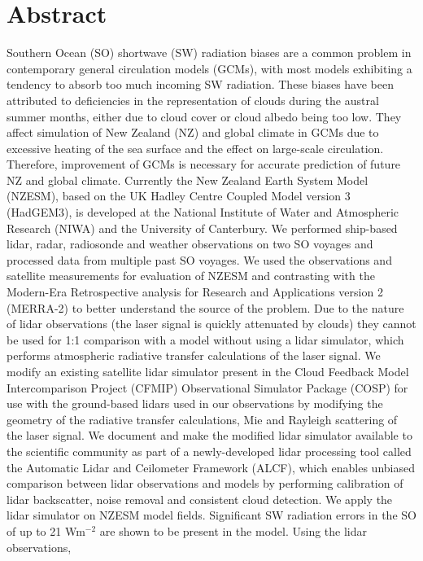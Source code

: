 \chapter*{Abstract}

\noindent
Southern Ocean (SO) shortwave (SW) radiation biases are a common
problem in contemporary general circulation models (GCMs), with most
models exhibiting a tendency to absorb too much incoming SW radiation.
These biases have been attributed to deficiencies in the representation of
clouds during the austral summer months, either due to cloud cover or cloud
albedo being too low. They affect simulation of New Zealand (NZ) and global
climate in GCMs due to excessive heating of the sea surface and the effect on
large-scale circulation. Therefore, improvement of GCMs is necessary for
accurate prediction of future NZ and global climate. Currently the New
Zealand Earth System Model (NZESM), based on the UK Hadley Centre
Coupled Model version 3 (HadGEM3), is developed at the National Institute
of Water and Atmospheric Research (NIWA) and the University of
Canterbury. We performed ship-based lidar, radar, radiosonde and weather
observations on two SO voyages and processed data from multiple past SO
voyages. We used the observations and satellite measurements for
evaluation of NZESM and contrasting with the Modern-Era Retrospective analysis
for Research and Applications version 2 (MERRA-2) to better
understand the source of the problem. Due to the nature of lidar
observations (the laser signal is quickly attenuated by clouds) they cannot be
used for 1:1 comparison with a model without using a lidar simulator, which
performs atmospheric radiative transfer calculations of the laser signal. We
modify an existing satellite lidar simulator present in the
Cloud Feedback Model Intercomparison Project (CFMIP)
Observational Simulator Package (COSP) for use with the ground-based lidars
used in our observations by modifying the geometry of the radiative transfer
calculations, Mie and Rayleigh scattering of the laser signal. We document
and make the modified lidar simulator available to the scientific community
as part of a newly-developed lidar processing tool called the Automatic Lidar and
Ceilometer Framework (ALCF), which enables unbiased comparison between
lidar observations and models by performing calibration of lidar backscatter,
noise removal and consistent cloud detection. We apply the lidar simulator
on NZESM model fields. Significant SW radiation errors in the SO of up to 21
Wm$^{-2}$ are shown to be present in the model. Using the lidar observations,
